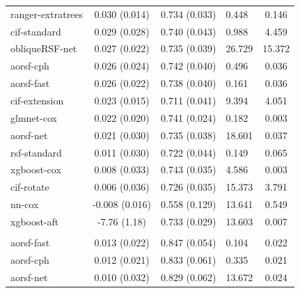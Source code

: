 \documentclass[twoside,11pt]{article}\usepackage[]{graphicx}\usepackage[]{xcolor}
\newenvironment{knitrout}{}{} %
\begin{document}
\begin{knitrout}
\begin{longtable}[t]{lcclc}
\hspace{1em}ranger-extratrees & 0.030 (0.014) & 0.734 (0.033) & 0.448 & 0.146\\
\hspace{1em}cif-standard & 0.029 (0.028) & 0.740 (0.043) & 0.988 & 4.459\\
\hspace{1em}obliqueRSF-net & 0.027 (0.022) & 0.735 (0.039) & 26.729 & 15.372\\
\hspace{1em}aorsf-cph & 0.026 (0.024) & 0.742 (0.040) & 0.496 & 0.036\\
\hspace{1em}aorsf-fast & 0.026 (0.022) & 0.738 (0.040) & 0.161 & 0.036\\
\hspace{1em}cif-extension & 0.023 (0.015) & 0.711 (0.041) & 9.394 & 4.051\\
\hspace{1em}glmnet-cox & 0.022 (0.020) & 0.741 (0.024) & 0.182 & 0.003\\
\hspace{1em}aorsf-net & 0.021 (0.030) & 0.735 (0.038) & 18.601 & 0.037\\
\hspace{1em}rsf-standard & 0.011 (0.030) & 0.722 (0.044) & 0.149 & 0.065\\
\hspace{1em}xgboost-cox & 0.008 (0.033) & 0.743 (0.035) & 4.586 & 0.003\\
\hspace{1em}cif-rotate & 0.006 (0.036) & 0.726 (0.035) & 15.373 & 3.791\\
\hspace{1em}nn-cox & -0.008 (0.016) & 0.558 (0.129) & 13.641 & 0.549\\
\hspace{1em}xgboost-aft & -7.76 (1.18) & 0.733 (0.029) & 13.603 & 0.007\\
\addlinespace[0.3em]
\hline
\multicolumn{5}{l}{\textit{\textbf{ACTG 320; death, n = 1151, p = 12}}}\\
\hline
\hspace{1em}aorsf-fast & 0.013 (0.022) & 0.847 (0.054) & 0.104 & 0.022\\
\hspace{1em}aorsf-cph & 0.012 (0.021) & 0.833 (0.061) & 0.335 & 0.021\\
\hspace{1em}aorsf-net & 0.010 (0.032) & 0.829 (0.062) & 13.672 & 0.024\\

\end{longtable}
\end{knitrout}
\end{document}
